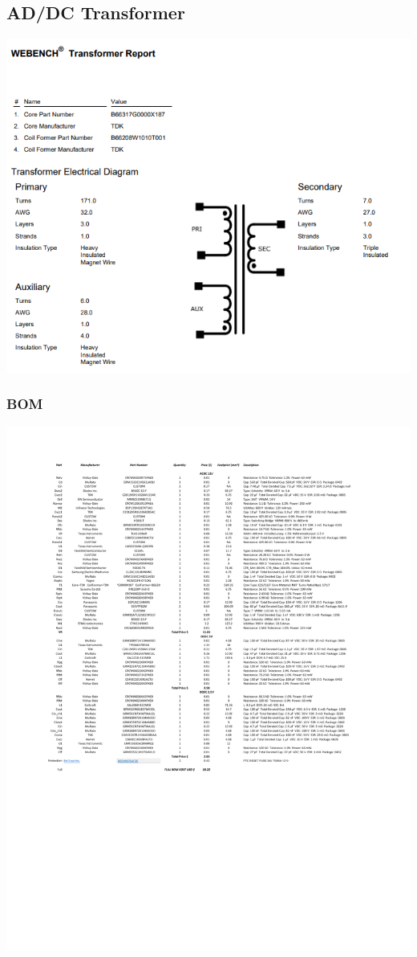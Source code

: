 \documentclass[11pt, a4]{article}
\begin{document}
\subsection*{AD/DC Transformer}
\includegraphics[width=\textwidth]{img/acdc_transformer.png}
\subsubsection*{BOM}
\includegraphics[width=\textwidth]{BOM.pdf}



\end{document}
